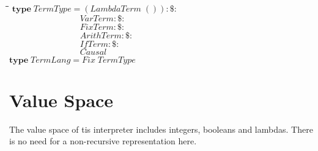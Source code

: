 \documentclass[10pt]{article}
\newlength{\lwidth}\setlength{\lwidth}{4.5cm}
\newlength{\cwidth}\setlength{\cwidth}{8mm} %
\newcommand{\Conid}[1]{\mathit{#1}}
\begin{document}
\begin{tabbing}
\qquad\=\hspace{\lwidth}\=\hspace{\cwidth}\=\+\kill
${\mathbf{type}\;\Conid{TermType}\mathrel{=}(\Conid{LambdaTerm}\;())\mathbin{:\$:}}$\\
${\phantom{\mathbf{type}\;\Conid{TermType}\mathrel{=}\mbox{}}\Conid{VarTerm}\mathbin{:\$:}}$\\
${\phantom{\mathbf{type}\;\Conid{TermType}\mathrel{=}\mbox{}}\Conid{FixTerm}\mathbin{:\$:}}$\\
${\phantom{\mathbf{type}\;\Conid{TermType}\mathrel{=}\mbox{}}\Conid{ArithTerm}\mathbin{:\$:}}$\\
${\phantom{\mathbf{type}\;\Conid{TermType}\mathrel{=}\mbox{}}\Conid{IfTerm}\mathbin{:\$:}}$\\
${\phantom{\mathbf{type}\;\Conid{TermType}\mathrel{=}\mbox{}}\Conid{Causal}}$\\
${}$\\
${\mathbf{type}\;\Conid{TermLang}\mathrel{=}\Conid{Fix}\;\Conid{TermType}}$
\end{tabbing}
\section{Value Space}

The value space of tis interpreter includes integers, booleans and
lambdas.  There is no need for a non-recursive representation here.
\end{document}
